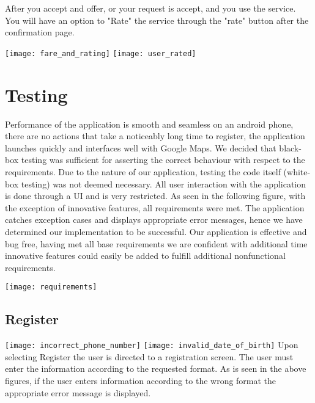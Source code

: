 \documentclass[english]{article}
\begin{document}
After you accept and offer, or your request is accept, and you use the service. You will have an option to "Rate" the service through the "rate" button after the confirmation page. 

\texttt{[image: fare\_and\_rating]}
\texttt{[image: user\_rated]}





\section{Testing}
\label{sec:testing}
Performance of the application is smooth and seamless on an android phone, there are no actions that take a noticeably long time to register, the application launches quickly and interfaces well with Google Maps. We decided that black-box testing was sufficient for asserting the correct behaviour with respect to the requirements. Due to the nature of our application, testing the code itself (white-box testing) was not deemed necessary. All user interaction with the application is done through a UI and is very restricted. As seen in the following figure, with the exception of innovative features, all requirements were met. The application catches exception cases and displays appropriate error messages, hence we have determined our implementation to be successful. Our application is effective and bug free, having met all base requirements we are confident with additional time innovative features could easily be added to fulfill additional nonfunctional requirements.

\texttt{[image: requirements]}

\subsection{Register}
\texttt{[image: incorrect\_phone\_number]}
\texttt{[image: invalid\_date\_of\_birth]}
\newline 
Upon selecting Register the user is directed to a registration screen. The user must enter the information according to the requested format. As is seen in the above figures, if the user enters information according to the wrong format the appropriate error message is displayed.
\end{document}
